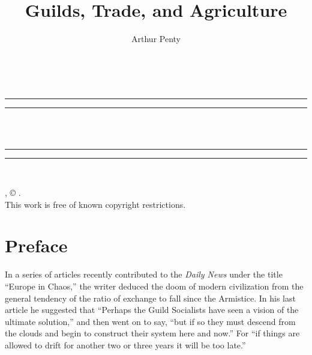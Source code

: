 \documentclass{book}
\date{}
\title{Guilds, Trade, and Agriculture}
\author{Arthur Penty}
\begin{document}
\thispagestyle{empty}
\begin{center}
	{\Huge \@title   \\[5mm]}
\end{center}
\newpage
\thispagestyle{empty}
\cleardoublepage
\begin{center}
	\thispagestyle{empty}
	\vspace*{\baselineskip}
	\rule{\textwidth}{1.6pt}\vspace*{-\baselineskip}\vspace*{2pt}
	\rule{\textwidth}{0.4pt}\\[\baselineskip]
	{\Huge\scshape \@title   \\[5mm]}
	{\Large }
	\rule{\textwidth}{0.4pt}\vspace*{-\baselineskip}\vspace{3.2pt}
	\rule{\textwidth}{1.6pt}\\[\baselineskip]
	\vspace*{4\baselineskip}
	{\Large \@author}
	\vfill
\end{center}
\pagebreak
\newpage
\thispagestyle{empty}
\null\vfill
\noindent
\begin{center}
	{\emph{\@title}, © \@author.\\[5mm]}
	{This work is free of known copyright restrictions.\\[5mm]}
\end{center}
\pagebreak
\newpage
\setcounter{tocdepth}{0}
\setcounter{secnumdepth}{0}

\chapter*{Preface}
\label{chapter-0}
In a series of articles recently contributed to the \emph{Daily News} under the title “Europe in Chaos,” the writer deduced the doom of modern civilization from the general tendency of the ratio of exchange to fall since the Armistice. In his last article he suggested that “Perhaps the Guild Socialists have seen a vision of the ultimate solution,” and then went on to say, “but if so they must descend from the clouds and begin to construct their system here and now.” For “if things are allowed to drift for another two or three years it will be too late.”
\end{document}
